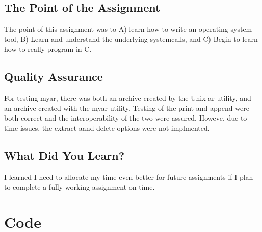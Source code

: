 \documentclass[letterpaper,10pt,titlepage]{article}
\begin{document}
\subsection{The Point of the Assignment}
\label{Point}
The point of this assignment was to A) learn how to write an operating system tool, B) Learn and understand the underlying systemcalls, and C) Begin to learn how to really program in C.
\subsection{Quality Assurance}
\label{QA}
For testing myar, there was both an archive created by the Unix ar utility, and an archive created with the myar utility. Testing of the print and append were both correct and the interoperability of the two were assured. Howeve, due to time issues, the extract aand delete options were not implmented.
\subsection{What Did You Learn?}
\label{Learned}
I learned I need to allocate my time even better for future assignments if I plan to complete a fully working assignment on time.


\section{Code}
\label{myar Source Code}

\end{document}
